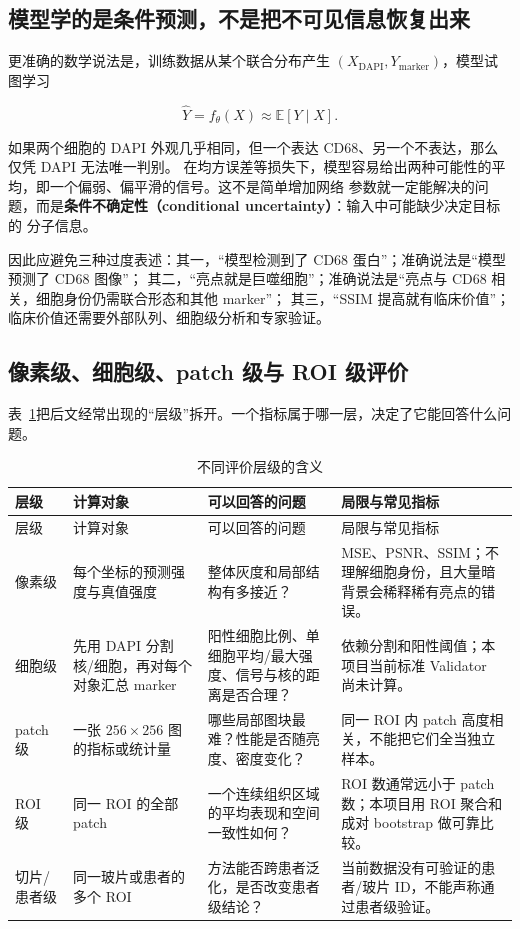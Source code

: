 \documentclass[12pt,a4paper,UTF8]{ctexart}
\newcommand{\term}[2]{\textbf{#1（#2）}}
\begin{document}
\subsection{模型学的是条件预测，不是把不可见信息恢复出来}

更准确的数学说法是，训练数据从某个联合分布产生 $(X_{\mathrm{DAPI}},Y_{\mathrm{marker}})$，模型试图学习

\begin{equation}
  \widehat{Y}=f_\theta(X)\approx \mathbb{E}[Y\mid X].
\end{equation}

如果两个细胞的 DAPI 外观几乎相同，但一个表达 CD68、另一个不表达，那么仅凭 DAPI 无法唯一判别。
在均方误差等损失下，模型容易给出两种可能性的平均，即一个偏弱、偏平滑的信号。这不是简单增加网络
参数就一定能解决的问题，而是\term{条件不确定性}{conditional uncertainty}：输入中可能缺少决定目标的
分子信息。

因此应避免三种过度表述：其一，“模型检测到了 CD68 蛋白”；准确说法是“模型预测了 CD68 图像”；
其二，“亮点就是巨噬细胞”；准确说法是“亮点与 CD68 相关，细胞身份仍需联合形态和其他 marker”；
其三，“SSIM 提高就有临床价值”；临床价值还需要外部队列、细胞级分析和专家验证。

\subsection{像素级、细胞级、patch 级与 ROI 级评价}

表~\ref{tab:evaluation-levels}把后文经常出现的“层级”拆开。一个指标属于哪一层，决定了它能回答什么问题。

\begin{longtable}{>{\raggedright\arraybackslash}p{}
                    >{\raggedright\arraybackslash}p{}
                    >{\raggedright\arraybackslash}p{}
                    >{\raggedright\arraybackslash}p{}}
\caption{不同评价层级的含义}\label{tab:evaluation-levels}\\
\toprule
层级 & 计算对象 & 可以回答的问题 & 局限与常见指标 \\
\midrule
\endfirsthead
\toprule
层级 & 计算对象 & 可以回答的问题 & 局限与常见指标 \\
\midrule
\endhead
像素级 & 每个坐标的预测强度与真值强度 & 整体灰度和局部结构有多接近？ & MSE、PSNR、SSIM；不理解细胞身份，且大量暗背景会稀释稀有亮点的错误。\\
细胞级 & 先用 DAPI 分割核/细胞，再对每个对象汇总 marker & 阳性细胞比例、单细胞平均/最大强度、信号与核的距离是否合理？ & 依赖分割和阳性阈值；本项目当前标准 Validator 尚未计算。\\
patch 级 & 一张 $256\times256$ 图的指标或统计量 & 哪些局部图块最难？性能是否随亮度、密度变化？ & 同一 ROI 内 patch 高度相关，不能把它们全当独立样本。\\
ROI 级 & 同一 ROI 的全部 patch & 一个连续组织区域的平均表现和空间一致性如何？ & ROI 数通常远小于 patch 数；本项目用 ROI 聚合和成对 bootstrap 做可靠比较。\\
切片/患者级 & 同一玻片或患者的多个 ROI & 方法能否跨患者泛化，是否改变患者级结论？ & 当前数据没有可验证的患者/玻片 ID，不能声称通过患者级验证。\\
\bottomrule
\end{longtable}
\end{document}
